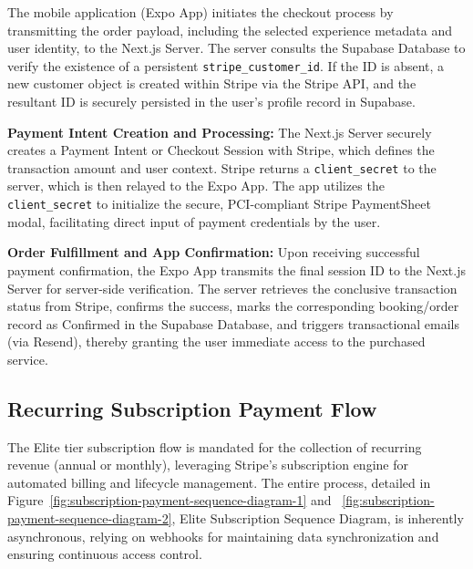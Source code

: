 {
\setlength{\textfloatsep}{4pt}
\setlength{\intextsep}{4pt}
\setlength{\floatsep}{4pt}
}

The mobile application (Expo App) initiates the checkout process by transmitting the order payload, including the selected experience metadata and user identity, to the Next.js Server.
The server consults the Supabase Database to verify the existence of a persistent \texttt{stripe\_customer\_id}. If the ID is absent, a new customer object is created within Stripe via the Stripe API, and the resultant ID is securely persisted in the user's profile record in Supabase.

\textbf{Payment Intent Creation and Processing:}
The Next.js Server securely creates a Payment Intent or Checkout Session with Stripe, which defines the transaction amount and user context.
Stripe returns a \texttt{client\_secret} to the server, which is then relayed to the Expo App.
The app utilizes the \texttt{client\_secret} to initialize the secure, PCI-compliant Stripe PaymentSheet modal, facilitating direct input of payment credentials by the user.

\textbf{Order Fulfillment and App Confirmation:}
Upon receiving successful payment confirmation, the Expo App transmits the final session ID to the Next.js Server for server-side verification.
The server retrieves the conclusive transaction status from Stripe, confirms the success, marks the corresponding booking/order record as Confirmed in the Supabase Database, and triggers transactional emails (via Resend), thereby granting the user immediate access to the purchased service.
\subsection{Recurring Subscription Payment Flow}
The Elite tier subscription flow is mandated for the collection of recurring revenue (annual or monthly), leveraging Stripe's subscription engine for automated billing and lifecycle management. The entire process, detailed in Figure~\ref{fig:subscription-payment-sequence-diagram-1} and ~\ref{fig:subscription-payment-sequence-diagram-2}, Elite Subscription Sequence Diagram, is inherently asynchronous, relying on webhooks for maintaining data synchronization and ensuring continuous access control.

